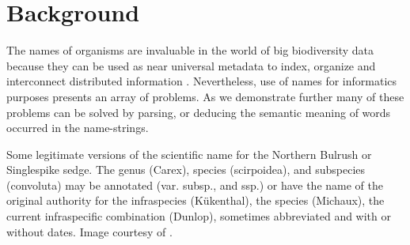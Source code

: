 \documentclass{bmcart}
\begin{document}
\section*{Background}

The names of organisms are invaluable in the world of big biodiversity data
because they can be used as near universal metadata to index, organize and
interconnect distributed information \cite{Patterson2010}. Nevertheless, use of
names for informatics purposes presents an array of problems. As we demonstrate
further many of these problems can be solved by parsing, or deducing the
semantic meaning of words occurred in the name-strings.

\begin{table}[!htb]
  \begin{center}

  \caption{Some legitimate versions of the scientific name for the Northern
    Bulrush or Singlespike sedge.  The genus (Carex), species (scirpoidea),
    and subspecies (convoluta) may be annotated (var. subsp., and ssp.) or
    have the name of the original authority for the infraspecies (Kükenthal),
    the species (Michaux), the current infraspecific combination (Dunlop),
    sometimes abbreviated and with or without dates. Image courtesy of
  \cite{FNA2002}.}\label{table:carex}


\end{center}
\end{table}
\end{document}
